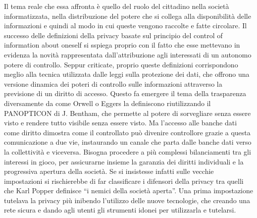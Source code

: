 Il tema reale che essa affronta è quello del ruolo del cittadino nella società informatizzata, nella distribuzione del potere che si collega alla disponibilità delle informazioni e quindi al modo in cui queste vengono raccolte e fatte circolare.
Il successo delle definizioni della privacy basate sul principio del control of information about oneself si sspiega proprio con il fatto che esse mettevano in evidenza la novità rappresentata dall’attribuzione agli interessati di un autonomo potere di controllo. Seppur criticate, proprio queste definizioni corrispondono meglio alla tecnica utilizzata dalle leggi sulla protezione dei dati, che offrono una versione dinamica dei poteri di controllo sulle informazioni attraverso la previsione di un diritto di accesso. Questo fa emergere il tema della trasparenza diversamente da come Orwell o Eggers la definiscono riutilizzando il PANOPTICON di J. Bentham, che permette al potere di sorvegliare senza essere visto e rendere tutto visibile senza essere visto. Ma l’accesso alle banche dati come diritto dimostra come il controllato può divenire controllore grazie a questa comunicazione a due vie, instaurando un canale che parta dalle banche dati verso la collettività e viceversa.
Bisogna procedere a più complessi bilanciamenti tra gli interessi in gioco, per assicurarne insieme la garanzia dei diritti individuali e la progressiva apertura della società. Se si insistesse infatti sulle vecchie impostazioni si rischierebbe di far classificare i difensori della privacy tra quelli che Karl Popper definisce “i nemici della società aperta”.
Una prima impostazione tutelava la privacy più inibendo l’utilizzo delle nuove tecnologie, che creando una rete sicura e dando agli utenti gli strumenti idonei per utilizzarla e tutelarsi.

